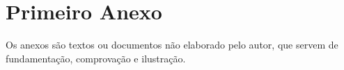 \chapter{Primeiro Anexo}

Os anexos são textos ou documentos não elaborado pelo autor, que servem de fundamentação, comprovação e ilustração.